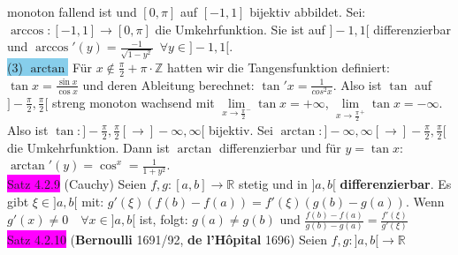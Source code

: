 \documentclass[landscape, 10pt]{article}
\newcommand{\R}{\mathbb{R}}
\begin{document}
\begin{multicols}{3}
                            monoton fallend ist
                            und $[0,\pi]$ auf $[-1,1]$ bijektiv abbildet. Sei:
                            $\arccos:[-1,1]\longrightarrow[0,\pi]$ die 
                            Umkehrfunktion. Sie ist auf $]-1,1[$ 
                            differenzierbar und
                            $\arccos'(y)=\frac{-1}{\sqrt{1-y^2}}\enspace
                            \forall y\in]-1,1[$.\\
                     \colorbox{SkyBlue}{(3) $\arctan$}
                            Für $x\notin\frac{\pi}{2}+\pi\cdot\mathbb{Z}$
                            hatten wir die Tangensfunktion definiert:
                            $\tan x=\frac{\sin x}{\cos x}$ und deren Ableitung 
                            berechnet:
                            $\tan'x=\frac{1}{cos^2x}$. Also ist $\tan$ auf
                            $]-\frac{\pi}{2},\frac{\pi}{2}[$ streng monoton wachsend mit
                            $\lim\limits_{x\to\frac{\pi}{2}^{-}}\tan x=+\infty$,
                            $\lim\limits_{x\to\frac{\pi}{2}^{+}}\tan x=-\infty$.
                            Also ist 
                            $\tan:]-\frac{\pi}{2},\frac{\pi}{2}[
                            \longrightarrow]-\infty,\infty[$ bijektiv. Sei
                            $\arctan:]-\infty,\infty[\longrightarrow
                            ]-\frac{\pi}{2},\frac{\pi}{2}[$ die 
                            Umkehrfunktion.
                            Dann ist $\arctan$ differenzierbar und für 
                            $y=\tan x$: $\arctan'(y)=\cos^x=\frac{1}{1+y^2}$.\\
              \colorbox{magenta}{Satz 4.2.9} 
              (Cauchy)
                     Seien 
                     \textcolor{NavyBlue}{$f,g:[a,b]\longrightarrow\R$}
                     stetig und in \textcolor{NavyBlue}{$]a,b[$} 
                     \textbf{differenzierbar}.
                     Es gibt \textcolor{NavyBlue}{$\xi\in]a,b[$} mit: 
                     \textcolor{NavyBlue}{$g'(\xi)(f(b)-f(a))=f'(\xi)(g(b)-g(a))$}. 
                     Wenn \textcolor{NavyBlue}{$g'(x)\neq0\quad\forall x\in]a,b[$} 
                     ist, folgt: \textcolor{NavyBlue}{$g(a)\neq g(b)$} und 
                     \textcolor{NavyBlue}{
                     $\frac{f(b)-f(a)}{g(b)-g(a)}=\frac{f'(\xi)}{g'(\xi)}$}\\ 
              \colorbox{magenta}{Satz 4.2.10} 
              (\textbf{Bernoulli} 1691/92, \textbf{de l'Hôpital} 1696) 
                     Seien \textcolor{NavyBlue}{$f,g:]a,b[\longrightarrow\R$} 

\end{multicols}
\end{document}
